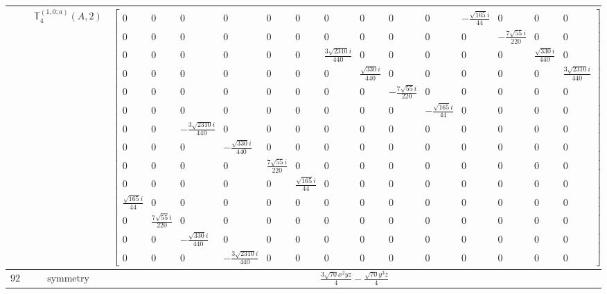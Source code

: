 \documentclass[fleqn,8pt,landscape]{jsarticle}
\begin{document}
\begin{longtable}{ccc}
$  $ & $ \mathbb{T}_{4}^{(1,0;a)}(A,2) $ & $ \begin{bmatrix} 0 & 0 & 0 & 0 & 0 & 0 & 0 & 0 & 0 & 0 & - \frac{\sqrt{165} i}{44} & 0 & 0 & 0 \\ 0 & 0 & 0 & 0 & 0 & 0 & 0 & 0 & 0 & 0 & 0 & - \frac{7 \sqrt{55} i}{220} & 0 & 0 \\ 0 & 0 & 0 & 0 & 0 & 0 & \frac{3 \sqrt{2310} i}{440} & 0 & 0 & 0 & 0 & 0 & \frac{\sqrt{330} i}{440} & 0 \\ 0 & 0 & 0 & 0 & 0 & 0 & 0 & \frac{\sqrt{330} i}{440} & 0 & 0 & 0 & 0 & 0 & \frac{3 \sqrt{2310} i}{440} \\ 0 & 0 & 0 & 0 & 0 & 0 & 0 & 0 & - \frac{7 \sqrt{55} i}{220} & 0 & 0 & 0 & 0 & 0 \\ 0 & 0 & 0 & 0 & 0 & 0 & 0 & 0 & 0 & - \frac{\sqrt{165} i}{44} & 0 & 0 & 0 & 0 \\ 0 & 0 & - \frac{3 \sqrt{2310} i}{440} & 0 & 0 & 0 & 0 & 0 & 0 & 0 & 0 & 0 & 0 & 0 \\ 0 & 0 & 0 & - \frac{\sqrt{330} i}{440} & 0 & 0 & 0 & 0 & 0 & 0 & 0 & 0 & 0 & 0 \\ 0 & 0 & 0 & 0 & \frac{7 \sqrt{55} i}{220} & 0 & 0 & 0 & 0 & 0 & 0 & 0 & 0 & 0 \\ 0 & 0 & 0 & 0 & 0 & \frac{\sqrt{165} i}{44} & 0 & 0 & 0 & 0 & 0 & 0 & 0 & 0 \\ \frac{\sqrt{165} i}{44} & 0 & 0 & 0 & 0 & 0 & 0 & 0 & 0 & 0 & 0 & 0 & 0 & 0 \\ 0 & \frac{7 \sqrt{55} i}{220} & 0 & 0 & 0 & 0 & 0 & 0 & 0 & 0 & 0 & 0 & 0 & 0 \\ 0 & 0 & - \frac{\sqrt{330} i}{440} & 0 & 0 & 0 & 0 & 0 & 0 & 0 & 0 & 0 & 0 & 0 \\ 0 & 0 & 0 & - \frac{3 \sqrt{2310} i}{440} & 0 & 0 & 0 & 0 & 0 & 0 & 0 & 0 & 0 & 0 \end{bmatrix} $ \\ \hline
$ 927 $ & $ \text{symmetry} $ & $ \frac{3 \sqrt{70} x^{2} y z}{4} - \frac{\sqrt{70} y^{3} z}{4} $ \\

\end{longtable}
\end{document}
